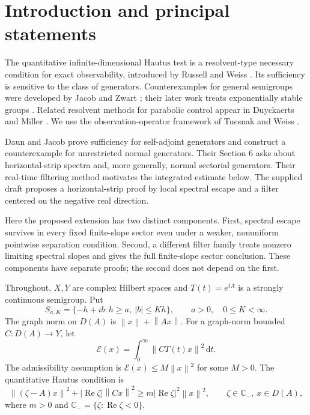 \documentclass[11pt,a4paper]{article}
\theoremstyle{definition}\newtheorem{definition}[theorem]{Definition}
\theoremstyle{remark}\newtheorem{remark}[theorem]{Remark}
\newcommand{\C}{\mathbb C}\newcommand{\R}{\mathbb R}\newcommand{\N}{\mathbb N}
\newcommand{\E}{\mathcal E}\newcommand{\D}{\mathcal D}
\newcommand{\dd}{\,\mathrm d}
\DeclareMathOperator{\Rea}{Re}\DeclareMathOperator{\Ima}{Im}
\newcommand{\norm}[1]{\left\lVert #1\right\rVert}
\begin{document}
\section{Introduction and principal statements}
The quantitative infinite-dimensional Hautus test is a resolvent-type necessary condition for exact observability, introduced by Russell and Weiss \cite{RW94}. Its sufficiency is sensitive to the class of generators. Counterexamples for general semigroups were developed by Jacob and Zwart \cite{JZ04}; their later work treats exponentially stable groups \cite{JZ09}. Related resolvent methods for parabolic control appear in Duyckaerts and Miller \cite{DM12}. We use the observation-operator framework of Tucsnak and Weiss \cite{TW09}.

Daun and Jacob \cite{DJ26} prove sufficiency for self-adjoint generators and construct a counterexample for unrestricted normal generators. Their Section 6 asks about horizontal-strip spectra and, more generally, normal sectorial generators. Their real-time filtering method motivates the integrated estimate below. The supplied draft \cite{Draft26} proposes a horizontal-strip proof by local spectral escape and a filter centered on the negative real direction.

Here the proposed extension has two distinct components. First, spectral escape survives in every fixed finite-slope sector even under a weaker, nonuniform pointwise separation condition. Second, a different filter family treats nonzero limiting spectral slopes and gives the full finite-slope sector conclusion. These components have separate proofs; the second does not depend on the first.

Throughout, $X,Y$ are complex Hilbert spaces and $T(t)=e^{tA}$ is a strongly continuous semigroup. Put
\begin{equation}\label{sector}
 S_{a,K}=\{-h+ib:h\ge a,\ |b|\le Kh\},\qquad a>0,\quad 0\le K<\infty.
\end{equation}
The graph norm on $D(A)$ is $\norm{x}+\norm{Ax}$. For a graph-norm bounded $C:D(A)\to Y$, let
\begin{equation}\label{energy}
 \E(x)=\int_0^\infty\norm{CT(t)x}^2\dd t.
\end{equation}
The admissibility assumption is $\E(x)\le M\norm{x}^2$ for some $M>0$. The quantitative Hautus condition is
\begin{equation}\label{H}\tag{$H_m$}
 \norm{(\zeta-A)x}^2+|\Rea\zeta|\norm{Cx}^2
 \ge m|\Rea\zeta|^2\norm{x}^2,
 \qquad \zeta\in\C_-,\ x\in D(A),
\end{equation}
where $m>0$ and $\C_-=\{\zeta:\Rea\zeta<0\}$.
\end{document}

